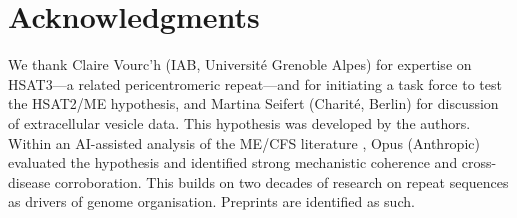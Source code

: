 \documentclass[11pt,a4paper]{scrartcl}
\providecommand{\doi}[1]{\href{https://doi.org/#1}{doi: #1}}
\begin{document}
\section*{Acknowledgments}

We thank Claire Vourc'h (IAB, Universit\'e Grenoble Alpes) for
expertise on HSAT3---a related pericentromeric repeat---and for
initiating a task force to test the HSAT2/ME hypothesis, and
Martina Seifert (Charit\'e, Berlin) for discussion of
extracellular vesicle data.  This hypothesis was
developed by the authors.  Within an AI-assisted analysis of the
ME/CFS literature \cite{Loth2026MECFS}, Opus (Anthropic) evaluated
the hypothesis and identified strong mechanistic coherence and
cross-disease corroboration.  This builds on two decades of
research on repeat sequences as drivers of genome organisation.  Preprints
\cite{Gerard2023CTCFpreprint,BonnetFourel2026ProAB} are identified
as such.

\renewcommand{\doi}[1]{\href{https://doi.org/#1}{doi: #1}}


\end{document}
